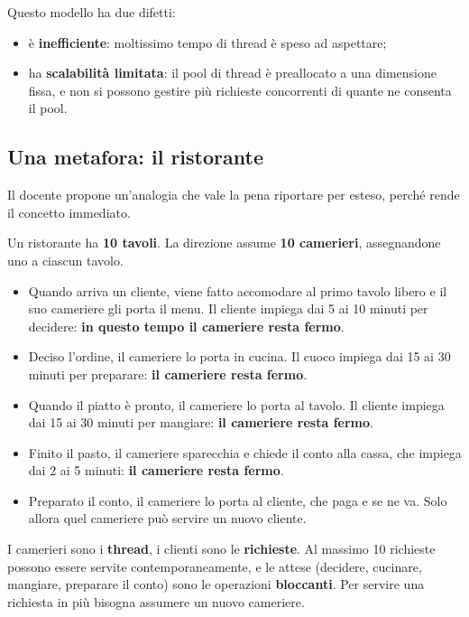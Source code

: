 Questo modello ha due difetti:

\begin{itemize}
  \item è \textbf{inefficiente}: moltissimo tempo di thread è speso ad
        aspettare;
  \item ha \textbf{scalabilità limitata}: il pool di thread è preallocato a una
        dimensione fissa, e non si possono gestire più richieste concorrenti di
        quante ne consenta il pool.
\end{itemize}

\subsection{Una metafora: il ristorante}

Il docente propone un'analogia che vale la pena riportare per esteso, perché
rende il concetto immediato.

Un ristorante ha \textbf{10 tavoli}. La direzione assume \textbf{10 camerieri},
assegnandone uno a ciascun tavolo.

\begin{itemize}
  \item Quando arriva un cliente, viene fatto accomodare al primo tavolo libero
        e il suo cameriere gli porta il menu. Il cliente impiega dai 5 ai 10
        minuti per decidere: \textbf{in questo tempo il cameriere resta fermo}.
  \item Deciso l'ordine, il cameriere lo porta in cucina. Il cuoco impiega dai
        15 ai 30 minuti per preparare: \textbf{il cameriere resta fermo}.
  \item Quando il piatto è pronto, il cameriere lo porta al tavolo. Il cliente
        impiega dai 15 ai 30 minuti per mangiare: \textbf{il cameriere resta
        fermo}.
  \item Finito il pasto, il cameriere sparecchia e chiede il conto alla cassa,
        che impiega dai 2 ai 5 minuti: \textbf{il cameriere resta fermo}.
  \item Preparato il conto, il cameriere lo porta al cliente, che paga e se ne
        va. Solo allora quel cameriere può servire un nuovo cliente.
\end{itemize}

I camerieri sono i \textbf{thread}, i clienti sono le \textbf{richieste}. Al
massimo 10 richieste possono essere servite contemporaneamente, e le attese
(decidere, cucinare, mangiare, preparare il conto) sono le operazioni
\textbf{bloccanti}. Per servire una richiesta in più bisogna assumere un nuovo
cameriere.

